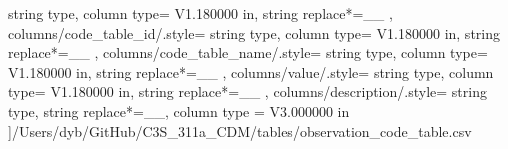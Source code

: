 \begin{landscape}
{            string type, 
            column type= V{1.180000 in}, 
            string replace*={_}{\_}
        },
    columns/code_table_id/.style={
            string type, 
            column type= V{1.180000 in}, 
            string replace*={_}{\_}
        },
    columns/code_table_name/.style={
            string type, 
            column type= V{1.180000 in}, 
            string replace*={_}{\_}
        },
    columns/value/.style={
            string type, 
            column type= V{1.180000 in}, 
            string replace*={_}{\_}
        },
    columns/description/.style={
            string type, 
            string replace*={_}{\_},
            column type = V{3.000000 in}
        }
    ]{/Users/dyb/GitHub/C3S_311a_CDM/tables/observation_code_table.csv}
\end{landscape}
